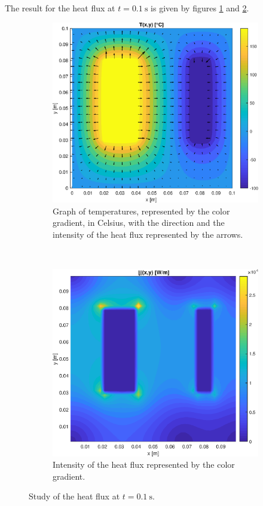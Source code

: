 \documentclass[a4paper,12pt,twoside]{article}
\begin{document}
The result for the heat flux at $t=\SI{0.1}{\second}$ is given by figures \ref{fig:c-temp} and \ref{fig:c-heat-flux}.

\begin{figure}[h]
  \centering
  \begin{subfigure}[t]{0.45\textwidth}
    \includegraphics[width=\textwidth]{graphs/c_temp.eps}
    \caption{Graph of temperatures, represented by the color gradient, in Celsius, with the direction and the intensity of the heat flux represented by the arrows.}
    \label{fig:c-temp}
  \end{subfigure}
  ~
  \begin{subfigure}[t]{0.45\textwidth}
    \includegraphics[width=\textwidth]{graphs/c_heat_flux.eps}
    \caption{Intensity of the heat flux represented by the color gradient.}
    \label{fig:c-heat-flux}
  \end{subfigure}
  \caption{Study of the heat flux at $t=\SI{0.1}{\second}$.}
  \label{fig:c}
\end{figure}
\end{document}
